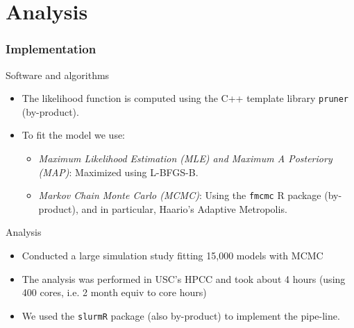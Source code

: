 \documentclass[aspectratio=169, 9pt]{beamer}\usepackage[]{graphicx}\usepackage[]{color}
\begin{document}
\section{Analysis}


\begin{frame}[label=aphylopkg]
\frametitle{Implementation}

{\large Software and algorithms}
\begin{itemize}[<+->]
\item The likelihood function is computed using the C++ template library \texttt{pruner} (by-product).
\item To fit the model we use:
\begin{itemize}
\item \textit{Maximum Likelihood Estimation (MLE) and Maximum A Posteriory (MAP)}: Maximized using L-BFGS-B.
\item \textit{Markov Chain Monte Carlo (MCMC)}: Using the \texttt{fmcmc} R package (by-product), and in particular, Haario's Adaptive Metropolis.
\end{itemize}
\end{itemize}

\pause
{\large Analysis}
\begin{itemize}[<+->]
\item Conducted a large simulation study fitting 15,000 models with MCMC
\item The analysis was performed in USC's HPCC and took about 4 hours (using 400 cores, i.e. 2 month equiv to core hours)
\item We used the \texttt{slurmR} package (also by-product) to implement the pipe-line.
\end{itemize}

\end{frame}

% 
\end{document}
